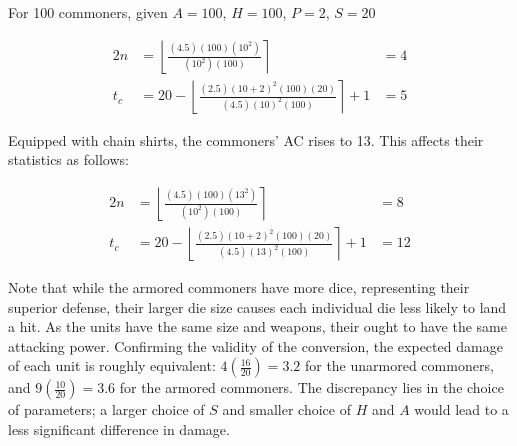 For 100 commoners, given $A = 100$, $H = 100$, $P = 2$, $S = 20$

\begin{alignat*}{2}
    n   &=
        \left\lfloor
            \frac
                {(4.5) (100) (10^2)}
                {(10^2) (100)}
        \right\rceil
            &= 4
    \\
    t_c &=
        20 -
        \left\lfloor
            \frac
                {(2.5) (10 + 2)^2 (100) (20)}
                {(4.5) (10)^2 (100)}
        \right\rceil
        + 1
            &= 5
\end{alignat*}

Equipped with chain shirts, the commoners' AC rises to 13.
This affects their statistics as follows:

\begin{alignat*}{2}
    n   &=
        \left\lfloor
            \frac
                {(4.5) (100) (13^2)}
                {(10^2) (100)}
        \right\rceil
            &= 8
    \\
    t_c &=
        20 -
        \left\lfloor
            \frac
                {(2.5) (10 + 2)^2 (100) (20)}
                {(4.5) (13)^2 (100)}
        \right\rceil
        + 1
            &= 12
\end{alignat*}

Note that while the armored commoners have more dice,
representing their superior defense,
their larger die size causes each individual die less likely to land a hit.
As the units have the same size and weapons,
their ought to have the same attacking power.
Confirming the validity of the conversion,
the expected damage of each unit is roughly equivalent:
$4(\frac{16}{20}) = 3.2$ for the unarmored commoners,
and $9(\frac{10}{20}) = 3.6$ for the armored commoners.
The discrepancy lies in the choice of parameters;
a larger choice of $S$ and smaller choice of $H$ and $A$
would lead to a less significant difference in damage.
